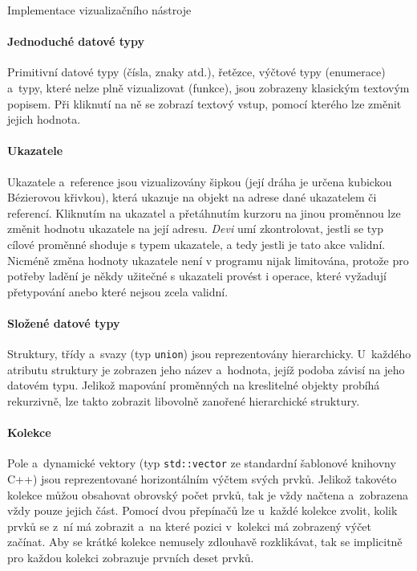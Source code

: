 \documentclass[czech,bachelor,male,python,dept460,hidelinks]{diploma}						%
\begin{document}
\begin{section}{Implementace vizualizačního nástroje}
	
	\paragraph*{Jednoduché datové typy} Primitivní datové typy (čísla, znaky atd.), řetězce, výčtové typy (enumerace) a~typy, které nelze plně vizualizovat
	(funkce), jsou zobrazeny klasickým textovým popisem. Při kliknutí na ně se zobrazí textový vstup, pomocí kterého lze změnit jejich hodnota.
	\paragraph*{Ukazatele} Ukazatele a~reference jsou vizualizovány šipkou (její dráha je určena kubickou Bézierovou křivkou), která ukazuje na objekt na adrese
	dané ukazatelem či referencí. Kliknutím na ukazatel a přetáhnutím kurzoru na jinou proměnnou lze změnit hodnotu ukazatele na její adresu.
	\textit{Devi} umí zkontrolovat, jestli se typ cílové proměnné shoduje s typem ukazatele, a tedy jestli je tato akce validní. Nicméně změna hodnoty
	ukazatele není v programu nijak limitována, protože pro potřeby ladění je někdy užitečné s ukazateli provést i operace, které vyžadují přetypování anebo
	které nejsou zcela validní.
	\paragraph*{Složené datové typy} Struktury, třídy a~svazy (typ \texttt{union}) jsou reprezentovány hierarchicky. U~každého atributu struktury je zobrazen jeho
	název a~hodnota, jejíž podoba závisí na jeho datovém typu. Jelikož mapování proměnných na kreslitelné objekty probíhá rekurzivně, lze takto zobrazit
	libovolně zanořené hierarchické struktury.
	\paragraph*{Kolekce} Pole a~dynamické vektory (typ \texttt{std::vector} ze standardní šablonové knihovny C++) jsou reprezentované horizontálním výčtem svých prvků.
	Jelikož takovéto kolekce můžou obsahovat obrovský počet prvků, tak je vždy načtena a~zobrazena vždy pouze jejich část. Pomocí dvou přepínačů lze u~každé
	kolekce zvolit, kolik prvků se z~ní má zobrazit a~na které pozici v~kolekci má zobrazený výčet začínat. Aby se krátké kolekce nemusely zdlouhavě rozklikávat,
	tak se implicitně pro každou kolekci zobrazuje prvních deset prvků.
	

\end{section}
\end{document}
